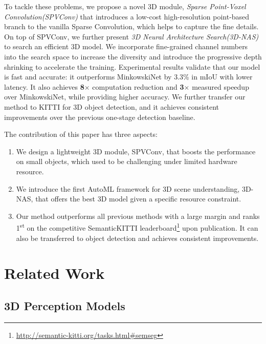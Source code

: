 \documentclass[runningheads]{llncs}
\def\module{Sparse Point-Voxel Convolution\xspace}
\def\moduleshort{SPVConv\xspace}
\def\nas{3D Neural Architecture Search\xspace}
\def\nasshort{3D-NAS\xspace}
\begin{document}
To tackle these problems, we propose a novel 3D module, \emph{\module (\moduleshort)} that introduces a low-cost high-resolution point-based branch to the vanilla Sparse Convolution, which helps to capture the fine details. On top of \moduleshort, we further present \emph{\nas (\nasshort)} to search an efficient 3D model. We incorporate fine-grained channel numbers into the search space to increase the diversity and introduce the progressive depth shrinking to accelerate the training. Experimental results validate that our model is fast and accurate: it outperforms MinkowskiNet by 3.3\% in mIoU with lower latency. It also achieves \textbf{8$\times$} computation reduction and \textbf{3$\times$} measured speedup over MinkowskiNet, while providing higher accuracy. We further transfer our method to KITTI for 3D object detection, and it achieves consistent improvements over the previous one-stage detection baseline.

The contribution of this paper has three aspects:
\begin{enumerate}
    \item We design a lightweight 3D module, \moduleshort, that boosts the performance on small objects, which used to be challenging under limited hardware resource.
    \item We introduce the first AutoML framework for 3D scene understanding, \nasshort, that offers the best 3D model given a specific resource constraint.
    \item Our method outperforms all previous methods with a large margin and ranks 1\textsuperscript{st} on the competitive SemanticKITTI leaderboard\footnote{\url{http://semantic-kitti.org/tasks.html#semseg}} upon publication. It can also be transferred to object detection and achieves consistent improvements.
\end{enumerate}
 \section{Related Work}

\subsection{3D Perception Models}
\end{document}
